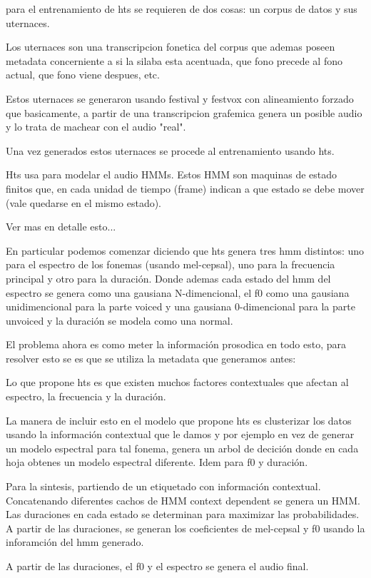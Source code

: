 para el entrenamiento de hts se requieren de dos cosas: un corpus de datos y sus uternaces.

Los uternaces son una transcripcion fonetica del corpus que ademas poseen metadata concerniente a si la silaba esta acentuada, que fono precede al fono actual, que fono viene despues, etc.

Estos uternaces se generaron usando festival y festvox con alineamiento forzado que basicamente, a partir de una transcripcion grafemica genera un posible audio y lo trata de machear con el audio "real".

Una vez generados estos uternaces se procede al entrenamiento usando hts.

Hts usa para modelar el audio HMMs. Estos HMM son maquinas de estado finitos que, en cada unidad de tiempo (frame) indican a que estado se debe mover (vale quedarse en el mismo estado). 

Ver mas en detalle esto...

En particular podemos comenzar diciendo que hts genera tres hmm distintos: uno para el espectro de los fonemas (usando mel-cepsal), uno para la frecuencia principal y otro para la duración. Donde ademas cada estado del hmm del espectro se genera como una gausiana N-dimencional, el f0 como una gausiana unidimencional para la parte voiced y una gausiana 0-dimencional para la parte unvoiced y la duración se modela como una normal.

El problema ahora es como meter la información prosodica en todo esto, para resolver esto se es que se utiliza la metadata que generamos antes:

Lo que propone hts es que existen muchos factores contextuales que afectan al espectro, la frecuencia y la duración. 

La manera de incluir esto en el modelo que propone hts es clusterizar los datos usando la información contextual que le damos y por ejemplo en vez de generar un modelo espectral para tal fonema, genera un arbol de decición donde en cada hoja obtenes un modelo espectral diferente. Idem para f0 y duración.

Para la sintesis, partiendo de un etiquetado con información contextual. Concatenando diferentes cachos de HMM context dependent se genera un HMM. Las duraciones en cada estado se determinan para maximizar las probabilidades. A partir de las duraciones, se generan los coeficientes de mel-cepsal y f0 usando la inforamción del hmm generado.

A partir de las duraciones, el f0 y el espectro se genera el audio final.